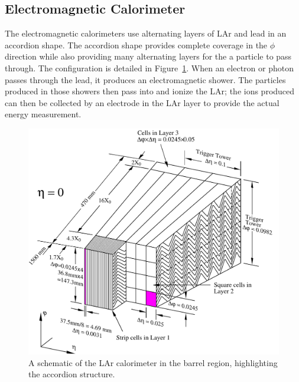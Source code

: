 \subsection{Electromagnetic Calorimeter}

The electromagnetic calorimeters use alternating layers of \acl{LAr} and lead in an accordion shape. 
The accordion shape provides complete coverage in the $\phi$ direction while also providing many alternating layers for the a particle to pass through.
The configuration is detailed in Figure~\ref{fig:calo_barrel_schematic}.
When an electron or photon passes through the lead, it produces an electromagnetic shower.
The particles produced in those showers then pass into and ionize the \acl{LAr}; the ions produced can then be collected by an electrode in the \acl{LAr} layer to provide the actual energy measurement.

\begin{figure}[hbtp]
\includegraphics[width=\fullfig]{figures/calo_barrel_schematic.pdf}
\caption{A schematic of the \ac{LAr} calorimeter in the barrel region, highlighting the accordion structure.}
\label{fig:calo_barrel_schematic}
\end{figure}

